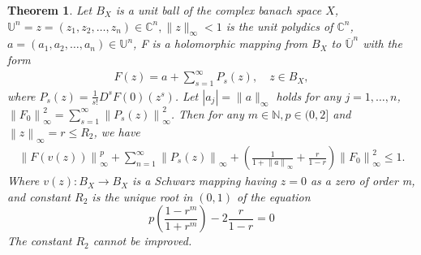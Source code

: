 \documentclass[10pt,a4paper]{amsart}
\newtheorem{thm}{Theorem}
\begin{document}
\begin{thm}
	Let $B_X$ is a unit ball of the complex banach space $X$, $\mathbb{U}^n={z=(z_1,z_2,\dots,z_n)\in\mathbb{C}^n,\|z\|_\infty<1}$ is the unit polydics of $\mathbb{C}^n$, $a=(a_1,a_2,\dots,a_n)\in\mathbb{U}^n$, F is a holomorphic mapping from $B_X $ to $\overline {\mathbb{U}}^n$  with the form	
	\begin{align*}
		F(z)=a+\sum_{s=1}^{\infty} P_s(z),\quad z \in B_X,
	\end{align*}
	where $P_s(z)=\frac{1}{s!} D^sF(0)(z^s)$.
	Let $\left |a_j \right |=\| a \|_\infty$ holds for any $j=1,\dots ,n$, $\left \| F_0 \right \| ^2_\infty=\sum_{s=1}^{\infty}\left \| P_s(z) \right \|^2_\infty$. Then for any $m \in \mathbb{N} , p \in (0,2]$ and $\left \| z \right \| _\infty=r \le R_2$, we have
	\begin{align}
		\left \| F(v(z)) \right \| _\infty^p +\sum_{n=1}^{\infty} \left \| P_s(z) \right \| _\infty+(\frac{1}{1+\left \| a \right \| _\infty} +\frac{r}{1-r} )\left \| F_0 \right \|^2_\infty \le 1.
	\end{align}
	Where $v(z): B_X \to B_X$ is a Schwarz mapping having $z=0$ as a zero of order m, and constant $R_2$ is the unique root in $(0,1)$ of the equation
	\begin{equation}
	p(\frac{1-r^m}{1+r^m} )-2\frac{r}{1-r}=0
	\end{equation}
	The constant $R_2$ cannot be improved.
\end{thm}
\end{document}
